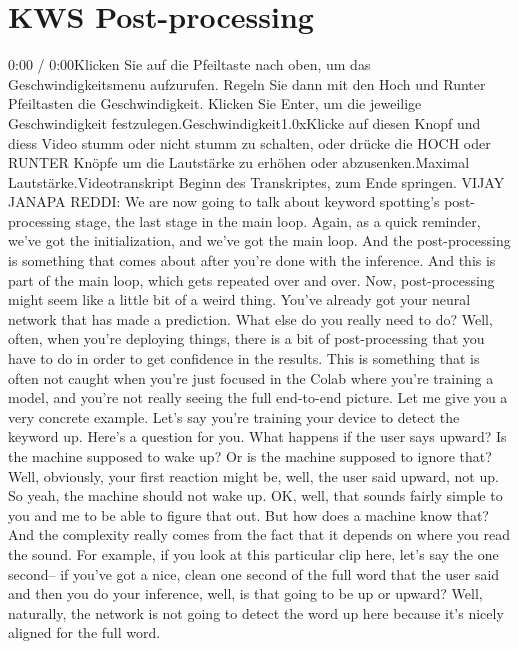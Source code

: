 \section{KWS Post-processing}

    0:00 / 0:00Klicken Sie auf die Pfeiltaste nach oben, um das Geschwindigkeitsmenu aufzurufen. Regeln Sie dann mit den Hoch und Runter Pfeiltasten die Geschwindigkeit. Klicken Sie Enter, um die jeweilige Geschwindigkeit festzulegen.Geschwindigkeit1.0xKlicke auf diesen Knopf und diess Video stumm oder nicht stumm zu schalten, oder drücke die HOCH oder RUNTER Knöpfe um die Lautstärke zu erhöhen oder abzusenken.Maximal Lautstärke.Videotranskript
    Beginn des Transkriptes, zum Ende springen.
    VIJAY JANAPA REDDI: We are now going to talk
    about keyword spotting's post-processing stage, the last stage in the main loop.
    Again, as a quick reminder, we've got the initialization,
    and we've got the main loop.
    And the post-processing is something that comes about
    after you're done with the inference.
    And this is part of the main loop, which gets repeated over and over.
    Now, post-processing might seem like a little bit of a weird thing.
    You've already got your neural network that has made a prediction.
    What else do you really need to do?
    Well, often, when you're deploying things,
    there is a bit of post-processing that you have to do in order
    to get confidence in the results.
    This is something that is often not caught when you're just
    focused in the Colab where you're training a model,
    and you're not really seeing the full end-to-end picture.
    Let me give you a very concrete example.
    Let's say you're training your device to detect the keyword up.
    Here's a question for you.
    What happens if the user says upward?
    Is the machine supposed to wake up?
    Or is the machine supposed to ignore that?
    Well, obviously, your first reaction might
    be, well, the user said upward, not up.
    So yeah, the machine should not wake up.
    OK, well, that sounds fairly simple to you and me
    to be able to figure that out.
    But how does a machine know that?
    And the complexity really comes from the fact
    that it depends on where you read the sound.
    For example, if you look at this particular clip here,
    let's say the one second--
    if you've got a nice, clean one second of the full word
    that the user said and then you do your inference,
    well, is that going to be up or upward?
    Well, naturally, the network is not going
    to detect the word up here because it's nicely aligned for the full word.
